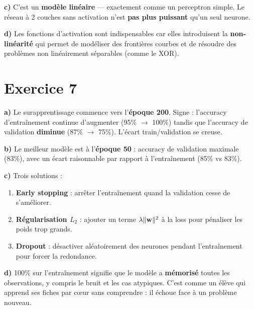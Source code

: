 \textbf{c)} C'est un \textbf{mod\`{e}le lin\'{e}aire} --- exactement comme un perceptron simple.
Le r\'{e}seau \`{a} 2 couches sans activation n'est \textbf{pas plus puissant} qu'un seul neurone.

\textbf{d)} Les fonctions d'activation sont indispensables car elles introduisent la
\textbf{non-lin\'{e}arit\'{e}} qui permet de mod\'{e}liser des fronti\`{e}res courbes et de r\'{e}soudre
des probl\`{e}mes non lin\'{e}airement s\'{e}parables (comme le XOR).

\section*{Exercice 7 \hfill \exointermediaire}

\separateur

\textbf{a)} Le surapprentissage commence vers l'\textbf{\'{e}poque 200}.
Signe : l'accuracy d'entra\^{i}nement continue d'augmenter (95\% $\to$ 100\%)
tandis que l'accuracy de validation \textbf{diminue} (87\% $\to$ 75\%).
L'\'{e}cart train/validation se creuse.

\textbf{b)} Le meilleur mod\`{e}le est \`{a} l'\textbf{\'{e}poque 50} : accuracy de validation
maximale (83\%), avec un \'{e}cart raisonnable par rapport \`{a} l'entra\^{i}nement (85\% vs 83\%).

\textbf{c)} Trois solutions :
\begin{enumerate}
    \item \textbf{Early stopping} : arr\^{e}ter l'entra\^{i}nement quand la validation cesse de s'am\'{e}liorer.
    \item \textbf{R\'{e}gularisation $L_2$} : ajouter un terme $\lambda\|\mathbf{w}\|^2$ \`{a} la loss pour p\'{e}naliser les poids trop grands.
    \item \textbf{Dropout} : d\'{e}sactiver al\'{e}atoirement des neurones pendant l'entra\^{i}nement pour forcer la redondance.
\end{enumerate}

\textbf{d)} 100\% sur l'entra\^{i}nement signifie que le mod\`{e}le a \textbf{m\'{e}moris\'{e}} toutes les observations, y compris le bruit et les cas atypiques. C'est comme un \'{e}l\`{e}ve qui apprend ses fiches par c\oe ur sans comprendre : il \'{e}choue face \`{a} un probl\`{e}me nouveau.

